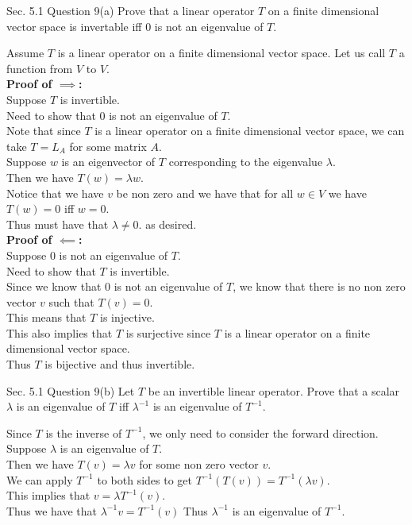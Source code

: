 \documentclass[answers,12pt,addpoints]{exam}
\begin{document}
\begin{questions}
    \question[10] Sec. 5.1 Question 9(a)
    Prove that a linear operator $T$ on a finite dimensional vector space is invertable iff $0$ is not an eigenvalue of $T$.
    \begin{solution}
        Assume $T$ is a linear operator on a finite dimensional vector space. Let us call $T$ a function from $V$ to $V$.\\
        \textbf{Proof of $\implies$:}\\
        Suppose $T$ is invertible. \\
        Need to show that $0$ is not an eigenvalue of $T$.\\
        Note that since $T$ is a linear operator on a finite dimensional vector space, we can take $T = L_A$ for some matrix $A$.\\
        Suppose $w$ is an eigenvector of $T$ corresponding to the eigenvalue $\lambda$.\\
        Then we have $T(w) = \lambda w$.\\
        Notice that we have $v$ be non zero and we have that for all $w \in V$ we have $T(w) = 0$ iff $w = 0$.\\
        Thus must have that $\lambda \neq 0$. as desired.\\
        \textbf{Proof of $\impliedby$:}\\
        Suppose $0$ is not an eigenvalue of $T$.\\
        Need to show that $T$ is invertible.\\
        Since we know that $0$ is not an eigenvalue of $T$, we know that there is no non zero vector $v$ such that $T(v) = 0$.\\
        This means that $T$ is injective.\\
        This also implies that $T$ is surjective since $T$ is a linear operator on a finite dimensional vector space.\\
        Thus $T$ is bijective and thus invertible.
    \end{solution}

    \question[10] Sec. 5.1 Question 9(b)
    Let $T$ be an invertible linear operator. Prove that a scalar $\lambda$ is an eigenvalue of $T$ iff $\lambda^{-1}$ is an eigenvalue of $T^{-1}$.
    \begin{solution}
        Since $T$ is the inverse of $T^{-1}$, we only need to consider the forward direction.\\
        Suppose $\lambda$ is an eigenvalue of $T$.\\
        Then we have $T(v) = \lambda v$ for some non zero vector $v$.\\
        We can apply $T^{-1}$ to both sides to get $T^{-1}(T(v)) = T^{-1}(\lambda v)$.\\
        This implies that $v = \lambda T^{-1}(v)$.\\
        Thus we have that $\lambda^{-1} v = T^{-1}(v)$
        Thus $\lambda^{-1}$ is an eigenvalue of $T^{-1}$. 
    \end{solution} 


\end{questions}
\end{document}
